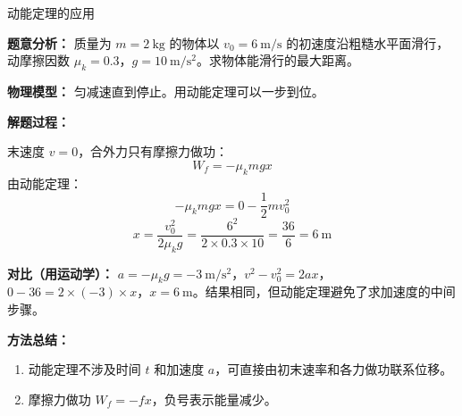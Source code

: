 \begin{examplebox}{动能定理的应用}

\textbf{题意分析：} 质量为 $m = 2\ \mathrm{kg}$ 的物体以 $v_0 = 6\ \mathrm{m/s}$ 的初速度沿粗糙水平面滑行，动摩擦因数 $\mu_k = 0.3$，$g = 10\ \mathrm{m/s^2}$。求物体能滑行的最大距离。

\textbf{物理模型：} 匀减速直到停止。用动能定理可以一步到位。

\textbf{解题过程：}

末速度 $v = 0$，合外力只有摩擦力做功：
\[
W_f = -\mu_k mg x
\]
由动能定理：
\[
-\mu_k mg x = 0 - \frac12 m v_0^2
\]
\[
x = \frac{v_0^2}{2\mu_k g} = \frac{6^2}{2 \times 0.3 \times 10} = \frac{36}{6} = 6\ \mathrm{m}
\]

\textbf{对比（用运动学）：} $a = -\mu_k g = -3\ \mathrm{m/s^2}$，$v^2 - v_0^2 = 2ax$，$0 - 36 = 2 \times (-3) \times x$，$x = 6\ \mathrm{m}$。结果相同，但动能定理避免了求加速度的中间步骤。

\textbf{方法总结：}
\begin{enumerate}
  \item 动能定理不涉及时间 $t$ 和加速度 $a$，可直接由初末速率和各力做功联系位移。
  \item 摩擦力做功 $W_f = -fx$，负号表示能量减少。
\end{enumerate}

\end{examplebox}

